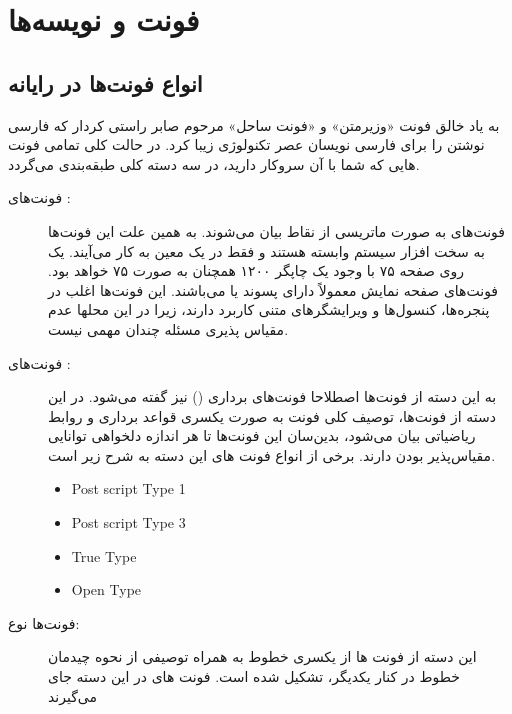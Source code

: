 \chapter{فونت و نویسه‌ها}\label{chp:chap2}
\thispagestyle{empty}
\normalfootnotes
\section{انواع فونت‌ها در رایانه}
به یاد خالق فونت «وزیرمتن» و «فونت ساحل»  مرحوم صابر راستی کردار که فارسی نوشتن را برای فارسی نویسان عصر تکنولوژی زیبا کرد.
در حالت کلی تمامی فونت هایی که شما با آن سروکار دارید، در سه دسته کلی طبقه‌بندی می‌گردد.
\begin{description}
 \item[ فونت‌های :] فونت‌های  به صورت ماتریسی از نقاط بیان می‌شوند. به همین علت این فونت‌ها به سخت افزار سیستم وابسته‌ هستند و فقط در یک  معین به کار می‌آیند. یک  روی صفحه ۷۵ با وجود یک چاپگر ۱۲۰۰ همچنان به صورت ۷۵ خواهد بود. فونت‌های  صفحه نمایش معمولاً دارای پسوند  یا  می‌باشند. این فونت‌ها اغلب در پنجره‌ها، کنسول‌ها و ویرایشگرهای متنی کاربرد دارند، زیرا در این محلها عدم مقیاس پذیری مسئله چندان مهمی نیست.
 \item[فونت‌های :] به این دسته از فونت‌ها اصطلاحا فونت‌های برداری () نیز گفته می‌شود. در این دسته از فونت‌ها، توصیف کلی فونت به صورت یکسری قواعد برداری و روابط ریاضیاتی بیان می‌شود، بدین‌سان این فونت‌‌ها تا هر اندازه دلخواهی توانایی مقیاس‌پذیر بودن دارند. برخی از انواع فونت های این دسته به شرح زیر است.
 \begin{latin}
\begin{itemize}
 \item Post script Type 1
    \item Post script Type 3
     \item True Type
     \item Open Type
\end{itemize}
\end{latin}
\item[فونت‌ها نوع:] این دسته از فونت ها از یکسری خطوط به همراه توصیفی از نحوه چیدمان خطوط در کنار یکدیگر، تشکیل شده است. فونت های در این دسته جای می‌گیرند
\end{description}
